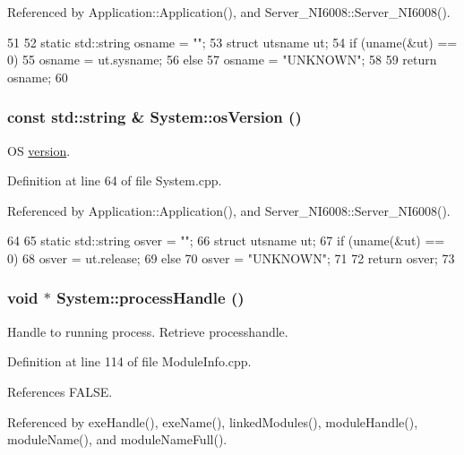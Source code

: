 Referenced by Application::Application(), and Server\_\-NI6008::Server\_\-NI6008().


\begin{DoxyCode}
51                                 {
52   static std::string osname = "";
53   struct utsname ut;
54   if (uname(&ut) == 0) {
55     osname = ut.sysname;
56   } else {
57     osname = "UNKNOWN";
58   }
59   return osname;
60 }
\end{DoxyCode}
\hypertarget{namespaceSystem_aee568b62f9bcad983dcb3f0c30631854}{
\subsubsection[{osVersion}]{\setlength{\rightskip}{0pt plus 5cm}const std::string \& System::osVersion ()}}
\label{namespaceSystem_aee568b62f9bcad983dcb3f0c30631854}


OS \hyperlink{namespaceversion}{version}. 

Definition at line 64 of file System.cpp.

Referenced by Application::Application(), and Server\_\-NI6008::Server\_\-NI6008().


\begin{DoxyCode}
64                                    {
65   static std::string osver = "";
66   struct utsname ut;
67   if (uname(&ut) == 0) {
68     osver = ut.release;
69   } else {
70     osver = "UNKNOWN";
71   }
72   return osver;
73 }
\end{DoxyCode}
\hypertarget{namespaceSystem_a563f947d4a2921f4348ff4f8e909a9f2}{
\subsubsection[{processHandle}]{\setlength{\rightskip}{0pt plus 5cm}void $\ast$ System::processHandle ()}}
\label{namespaceSystem_a563f947d4a2921f4348ff4f8e909a9f2}


Handle to running process. Retrieve processhandle. 

Definition at line 114 of file ModuleInfo.cpp.

References FALSE.

Referenced by exeHandle(), exeName(), linkedModules(), moduleHandle(), moduleName(), and moduleNameFull().


